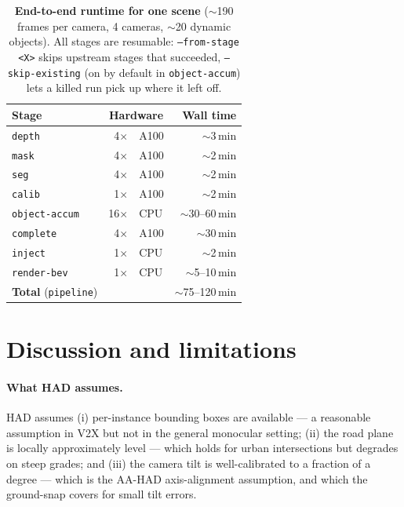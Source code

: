 \documentclass[10pt,twocolumn,letterpaper]{article}
\begin{document}
\begin{table}[t]
  \centering
  \small
  \begin{tabular}{lr@{\,}lr}
    \toprule
    Stage & \multicolumn{2}{c}{Hardware} & Wall time \\
    \midrule
    \texttt{depth}        & 4$\times$ & A100 & $\sim$3\,min \\
    \texttt{mask}         & 4$\times$ & A100 & $\sim$2\,min \\
    \texttt{seg}          & 4$\times$ & A100 & $\sim$2\,min \\
    \texttt{calib}        & 1$\times$ & A100 & $\sim$2\,min \\
    \texttt{object-accum} & 16$\times$ & CPU & $\sim$30--60\,min \\
    \texttt{complete}     & 4$\times$ & A100 & $\sim$30\,min \\
    \texttt{inject}       & 1$\times$ & CPU & $\sim$2\,min \\
    \texttt{render-bev}   & 1$\times$ & CPU & $\sim$5--10\,min \\
    \midrule
    \textbf{Total} (\texttt{pipeline}) & & & $\sim$75--120\,min \\
    \bottomrule
  \end{tabular}
  \caption{\textbf{End-to-end runtime for one scene} ($\sim$190 frames per
  camera, 4 cameras, $\sim$20 dynamic objects). All stages are
  resumable: \texttt{--from-stage <X>} skips upstream stages that
  succeeded, \texttt{--skip-existing} (on by default in
  \texttt{object-accum}) lets a killed run pick up where it left off.}
  \label{tab:runtime}
\end{table}


\section{Discussion and limitations}
\label{sec:discussion}

\paragraph{What HAD assumes.} HAD assumes (i) per-instance bounding
boxes are available — a reasonable assumption in V2X but not in the
general monocular setting; (ii) the road plane is locally
approximately level — which holds for urban intersections but degrades
on steep grades; and (iii) the camera tilt is well-calibrated to a
fraction of a degree — which is the AA-HAD axis-alignment assumption,
and which the ground-snap covers for small tilt errors.
\end{document}
